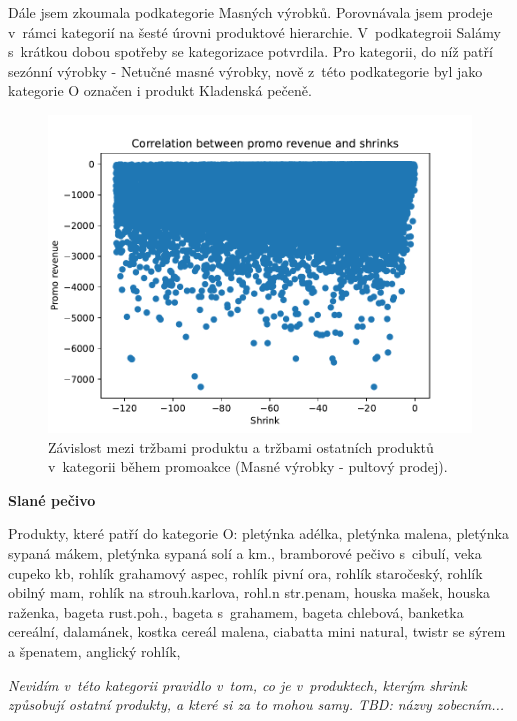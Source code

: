 Dále jsem zkoumala podkategorie Masných výrobků. Porovnávala jsem prodeje v~rámci kategorií na šesté úrovni produktové hierarchie. V~podkategroii Salámy s~krátkou dobou spotřeby se kategorizace potvrdila. Pro kategorii, do níž patří sezónní výrobky - Netučné masné výrobky, nově z~této podkategorie byl jako kategorie O označen i produkt Kladenská pečeně.

\begin{figure}[hbtp!]
    \centering
    \captionsetup{justification=centering}
    \includegraphics[width=\textwidth]{obrazky/grafy/categorization_charts/categorization_charts_L4_PROC MEAT SERVICE.pdf}
    \caption{Závislost mezi tržbami produktu a tržbami ostatních produktů v~kategorii během promoakce (Masné výrobky - pultový prodej).}
    \label{obr:ctg:g:graf}
\end{figure}

\textbf{Slané pečivo}

Produkty, které patří do kategorie O:
pletýnka adélka, pletýnka malena, pletýnka sypaná mákem, pletýnka sypaná solí a km., bramborové pečivo s~cibulí, veka cupeko kb, rohlík grahamový aspec, rohlík pivní ora, rohlík staročeský, rohlík obilný mam, rohlík na strouh.karlova, rohl.n str.penam, houska mašek, houska raženka, bageta rust.poh., bageta s~grahamem, bageta chlebová, banketka cereální, dalamánek, kostka cereál malena, ciabatta mini natural, twistr se sýrem a špenatem, anglický rohlík, 

\emph{Nevidím v~této kategorii pravidlo v~tom, co je v~produktech, kterým shrink způsobují ostatní produkty, a které si za to mohou samy. TBD: názvy zobecním...}

